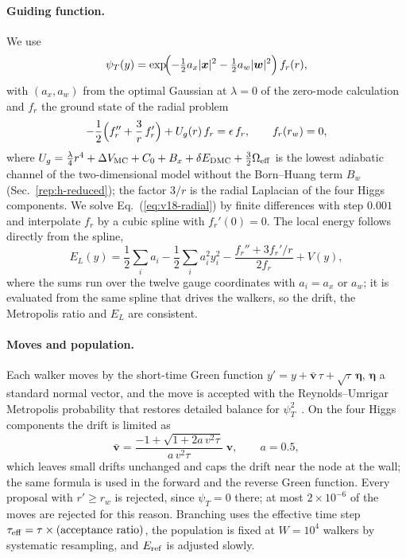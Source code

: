 \paragraph{Guiding function.}
We use
\begin{equation}
\psi_T(y)=\exp\!\Bigl(-\tfrac12a_x|\bm x|^2-\tfrac12a_w|\bm w|^2\Bigr)\,f_r(r),
\label{eq:v18-psiT}
\end{equation}
with $(a_x,a_w)$ from the optimal Gaussian at $\lambda=0$ of the zero-mode calculation and $f_r$ the ground state of the radial problem
\begin{equation}
-\frac12\Bigl(f_r''+\frac3r\,f_r'\Bigr)+U_g(r)\,f_r=\epsilon\,f_r,\qquad f_r(r_w)=0,
\label{eq:v18-radial}
\end{equation}
where $U_g=\frac\lambda4r^4+\Delta V_{\rm MC}+C_0+B_x+\delta E_{\rm DMC}+\frac32\Omega_{\rm eff}$ is the lowest adiabatic channel of the two-dimensional model without the Born--Huang term $B_w$ (Sec.~\ref{rep:h-reduced}); the factor $3/r$ is the radial Laplacian of the four Higgs components.
We solve Eq.~(\ref{eq:v18-radial}) by finite differences with step $0.001$ and interpolate $f_r$ by a cubic spline with $f_r'(0)=0$.
The local energy follows directly from the spline,
\begin{equation}
E_L(y)=\frac12\sum_ia_i-\frac12\sum_ia_i^2y_i^2-\frac{f_r''+3f_r'/r}{2f_r}+V(y),
\label{eq:v18-EL}
\end{equation}
where the sums run over the twelve gauge coordinates with $a_i=a_x$ or $a_w$; it is evaluated from the same spline that drives the walkers, so the drift, the Metropolis ratio and $E_L$ are consistent.

\paragraph{Moves and population.}
Each walker moves by the short-time Green function $y'=y+\bar{\bm v}\,\tau+\sqrt\tau\,\bm\eta$, $\bm\eta$ a standard normal vector, and the move is accepted with the Reynolds--Umrigar Metropolis probability that restores detailed balance for $\psi_T^2$~\cite{Umrigar:1993dmc}.
On the four Higgs components the drift is limited as
\begin{equation}
\bar{\bm v}=\frac{-1+\sqrt{1+2a\,v^2\tau}}{a\,v^2\tau}\;\bm v,\qquad a=0.5,
\label{eq:v18-drift}
\end{equation}
which leaves small drifts unchanged and caps the drift near the node at the wall; the same formula is used in the forward and the reverse Green function. %
Every proposal with $r'\ge r_w$ is rejected, since $\psi_T=0$ there; at most $2\times10^{-6}$ of the moves are rejected for this reason. %
Branching uses the effective time step $\tau_{\rm eff}=\tau\times(\text{acceptance ratio})$, the population is fixed at $W=10^4$ walkers by systematic resampling, and $E_{\rm ref}$ is adjusted slowly. %

